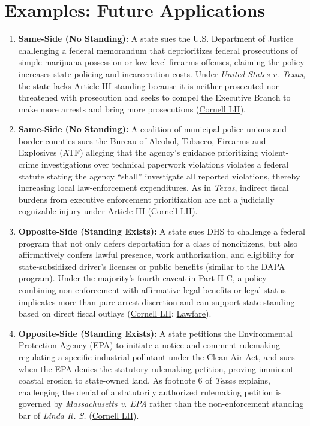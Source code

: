 \documentclass[12pt]{article}
\begin{document}
\section{Examples: Future Applications}

\begin{enumerate}
\item \textbf{Same-Side (No Standing):} A state sues the U.S. Department of Justice challenging a federal memorandum that deprioritizes federal prosecutions of simple marijuana possession or low-level firearms offenses, claiming the policy increases state policing and incarceration costs. Under \textit{United States v. Texas}, the state lacks Article III standing because it is neither prosecuted nor threatened with prosecution and seeks to compel the Executive Branch to make more arrests and bring more prosecutions (\href{https://www.law.cornell.edu/supremecourt/text/22-58}{Cornell LII}).
\item \textbf{Same-Side (No Standing):} A coalition of municipal police unions and border counties sues the Bureau of Alcohol, Tobacco, Firearms and Explosives (ATF) alleging that the agency's guidance prioritizing violent-crime investigations over technical paperwork violations violates a federal statute stating the agency ``shall'' investigate all reported violations, thereby increasing local law-enforcement expenditures. As in \textit{Texas}, indirect fiscal burdens from executive enforcement prioritization are not a judicially cognizable injury under Article III (\href{https://www.law.cornell.edu/supremecourt/text/22-58}{Cornell LII}).
\item \textbf{Opposite-Side (Standing Exists):} A state sues DHS to challenge a federal program that not only defers deportation for a class of noncitizens, but also affirmatively confers lawful presence, work authorization, and eligibility for state-subsidized driver's licenses or public benefits (similar to the DAPA program). Under the majority's fourth caveat in Part II-C, a policy combining non-enforcement with affirmative legal benefits or legal status implicates more than pure arrest discretion and can support state standing based on direct fiscal outlays (\href{https://www.law.cornell.edu/supremecourt/text/22-58}{Cornell LII}; \href{https://www.lawfaremedia.org/article/united-states-v.-texas-explained}{Lawfare}).
\item \textbf{Opposite-Side (Standing Exists):} A state petitions the Environmental Protection Agency (EPA) to initiate a notice-and-comment rulemaking regulating a specific industrial pollutant under the Clean Air Act, and sues when the EPA denies the statutory rulemaking petition, proving imminent coastal erosion to state-owned land. As footnote 6 of \textit{Texas} explains, challenging the denial of a statutorily authorized rulemaking petition is governed by \textit{Massachusetts v. EPA} rather than the non-enforcement standing bar of \textit{Linda R. S.} (\href{https://www.law.cornell.edu/supremecourt/text/22-58}{Cornell LII}).

\end{enumerate}
\end{document}
